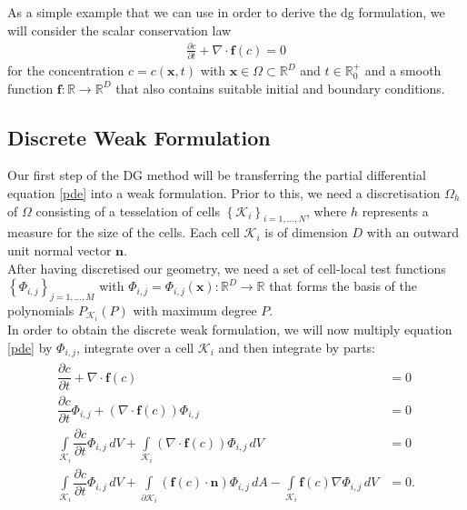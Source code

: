 		As a simple example that we can use in order to derive the \gls{dg} formulation, we will consider the scalar conservation law 	
		\begin{align}
			\frac{\partial c}{\partial t} + \nabla \cdot \boldsymbol{f}(c) = 0
			\label{pde}
		\end{align}	
		for the concentration $c = c(\boldsymbol{x}, t)$  with $\mathbf{x} \in \Omega \subset \mathbb{R}^D$ and $t\in \mathbb{R}_0^+$ and a smooth function $\boldsymbol{f}:\mathbb{R} \rightarrow \mathbb{R}^D$ that also contains suitable initial and boundary conditions.\cite{mueller2014} 
		\subsection{Discrete Weak Formulation}
		Our first step of the DG method will be transferring the partial differential equation \eqref{pde} into a weak formulation.
		Prior to this, we need a discretisation $\Omega_h$ of $\Omega$ consisting of a tesselation of cells $\left\{ \mathcal{K}_i \right\}_{i=1,...,N}$, where $h$ represents a measure for the size of the cells. Each cell $\mathcal{K}_i$ is of dimension $D$ with an outward unit normal vector $\boldsymbol{n}$. \\ \indent 
		After having discretised our geometry, we need a set of cell-local test functions $\left\{\Phi_{i,j}\right\}_{j=1,...,M} $ with $\Phi_{i,j}=\Phi_{i,j}(\boldsymbol{x}):\mathbb{R}^D\rightarrow\mathbb{R}$ that forms the basis of the polynomials $P_{\mathcal{K}_i}(P)$ with maximum degree $P$. \\ \indent
		In order to obtain the discrete weak formulation, we will now multiply equation \eqref{pde} by $\Phi_{i,j}$, integrate over a cell $\mathcal{K}_i$ and then integrate by parts:	
		\begin{gather}	
			\begin{aligned}
			\dfrac{\partial c}{\partial t} + \nabla \cdot \boldsymbol{f}(c) &= 0 \\ 
			\dfrac{\partial c}{\partial t}\Phi_{i,j} + \left(\nabla \cdot \boldsymbol{f}(c)\right)\Phi_{i,j} &= 0 \\ 
			\int\limits_{\mathcal{K}_i} \dfrac{\partial c}{\partial t}\Phi_{i,j} \, dV + \int\limits_{\mathcal{K}_i}\left(\nabla \cdot \boldsymbol{f}(c)\right)\Phi_{i,j} \, dV &= 0\\ 
			\int\limits_{\mathcal{K}_i} \dfrac{\partial c}{\partial t}\Phi_{i,j} \, dV +
			\int\limits_{\partial \mathcal{K}_i} \left(\boldsymbol{f} \left( c \right) \cdot \boldsymbol{n} \right)\Phi_{i,j} \, dA
			- \int\limits_{\mathcal{K}_i} \boldsymbol{f}\left(c\right)\nabla\Phi_{i,j} \, dV &= 0.
			\label{partialintegration}
			\end{aligned}
		\end{gather}
